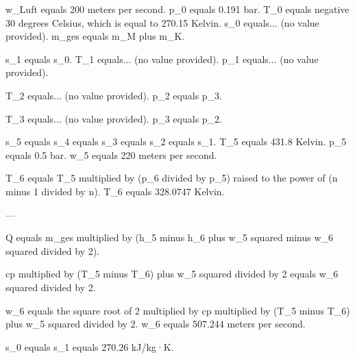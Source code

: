 w_Luft equals 200 meters per second.  
p_0 equals 0.191 bar.  
T_0 equals negative 30 degrees Celsius, which is equal to 270.15 Kelvin.  
s_0 equals... (no value provided).  
m_ges equals m_M plus m_K.  

s_1 equals s_0.  
T_1 equals... (no value provided).  
p_1 equals... (no value provided).  

T_2 equals... (no value provided).  
p_2 equals p_3.  

T_3 equals... (no value provided).  
p_3 equals p_2.  

s_5 equals s_4 equals s_3 equals s_2 equals s_1.  
T_5 equals 431.8 Kelvin.  
p_5 equals 0.5 bar.  
w_5 equals 220 meters per second.  

T_6 equals T_5 multiplied by (p_6 divided by p_5) raised to the power of (n minus 1 divided by n).  
T_6 equals 328.0747 Kelvin.  

---

Q equals m_ges multiplied by (h_5 minus h_6 plus w_5 squared minus w_6 squared divided by 2).  

cp multiplied by (T_5 minus T_6) plus w_5 squared divided by 2 equals w_6 squared divided by 2.  

w_6 equals the square root of 2 multiplied by cp multiplied by (T_5 minus T_6) plus w_5 squared divided by 2.  
w_6 equals 507.244 meters per second.  

s_0 equals s_1 equals 270.26 kJ/kg·K.